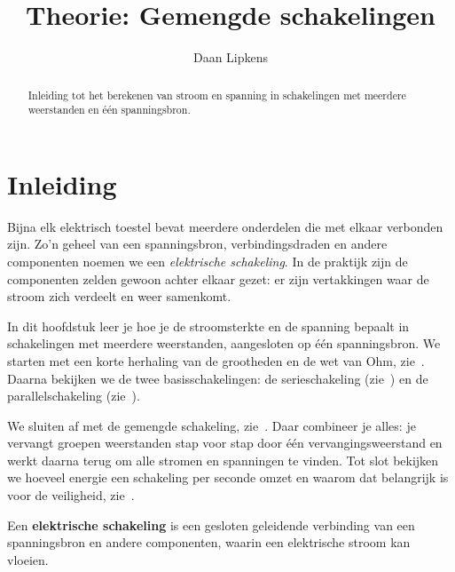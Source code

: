 \documentclass{ximera}
\title{Theorie: Gemengde schakelingen}
\author{Daan Lipkens}
\begin{document}
\begin{abstract}
    Inleiding tot het berekenen van stroom en spanning in schakelingen met meerdere weerstanden en één spanningsbron.
\end{abstract}
\maketitle
\label{hoofdstuk:schakelingen}
\section*{Inleiding}
Bijna elk elektrisch toestel bevat meerdere onderdelen die met elkaar verbonden zijn. Zo'n geheel van een spanningsbron, verbindingsdraden en andere componenten noemen we een \emph{elektrische schakeling}. In de praktijk zijn de componenten zelden gewoon achter elkaar gezet: er zijn vertakkingen waar de stroom zich verdeelt en weer samenkomt.

In dit hoofdstuk leer je hoe je de stroomsterkte en de spanning bepaalt in schakelingen met meerdere weerstanden, aangesloten op één spanningsbron. We starten met een korte herhaling van de grootheden en de wet van Ohm, zie~. Daarna bekijken we de twee basisschakelingen: de serieschakeling (zie~) en de parallelschakeling (zie~).

We sluiten af met de gemengde schakeling, zie~. Daar combineer je alles: je vervangt groepen weerstanden stap voor stap door één vervangingsweerstand en werkt daarna terug om alle stromen en spanningen te vinden. Tot slot bekijken we hoeveel energie een schakeling per seconde omzet en waarom dat belangrijk is voor de veiligheid, zie~.

\begin{definition}[title={Elektrische schakeling}]\nl
    Een \textbf{elektrische schakeling} is een gesloten geleidende verbinding van een spanningsbron en andere componenten, waarin een elektrische stroom kan vloeien.
\end{definition}
\end{document}
